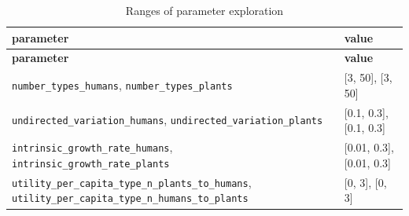 \documentclass[
]{book}
\begin{document}
\begin{longtable}[]{@{}ll@{}}
\caption{Ranges of parameter exploration}\tabularnewline
\toprule
\begin{minipage}[b]{0.33\columnwidth}\raggedright
\textbf{parameter}\strut
\end{minipage} & \begin{minipage}[b]{0.62\columnwidth}\raggedright
\textbf{value}\strut
\end{minipage}\tabularnewline
\midrule
\endfirsthead
\toprule
\begin{minipage}[b]{0.33\columnwidth}\raggedright
\textbf{parameter}\strut
\end{minipage} & \begin{minipage}[b]{0.62\columnwidth}\raggedright
\textbf{value}\strut
\end{minipage}\tabularnewline
\midrule
\endhead
\begin{minipage}[t]{0.33\columnwidth}\raggedright
\texttt{number\_types\_humans}, \texttt{number\_types\_plants}\strut
\end{minipage} & \begin{minipage}[t]{0.62\columnwidth}\raggedright
{[}3, 50{]}, {[}3, 50{]}\strut
\end{minipage}\tabularnewline
\begin{minipage}[t]{0.33\columnwidth}\raggedright
\texttt{undirected\_variation\_humans}, \texttt{undirected\_variation\_plants}\strut
\end{minipage} & \begin{minipage}[t]{0.62\columnwidth}\raggedright
{[}0.1, 0.3{]}, {[}0.1, 0.3{]}\strut
\end{minipage}\tabularnewline
\begin{minipage}[t]{0.33\columnwidth}\raggedright
\texttt{intrinsic\_growth\_rate\_humans}, \texttt{intrinsic\_growth\_rate\_plants}\strut
\end{minipage} & \begin{minipage}[t]{0.62\columnwidth}\raggedright
{[}0.01, 0.3{]}, {[}0.01, 0.3{]}\strut
\end{minipage}\tabularnewline
\begin{minipage}[t]{0.33\columnwidth}\raggedright
\texttt{utility\_per\_capita\_type\_n\_plants\_to\_humans}, \texttt{utility\_per\_capita\_type\_n\_humans\_to\_plants}\strut
\end{minipage} & \begin{minipage}[t]{0.62\columnwidth}\raggedright
{[}0, 3{]}, {[}0, 3{]}\strut
\end{minipage}\tabularnewline

\end{longtable}
\end{document}
